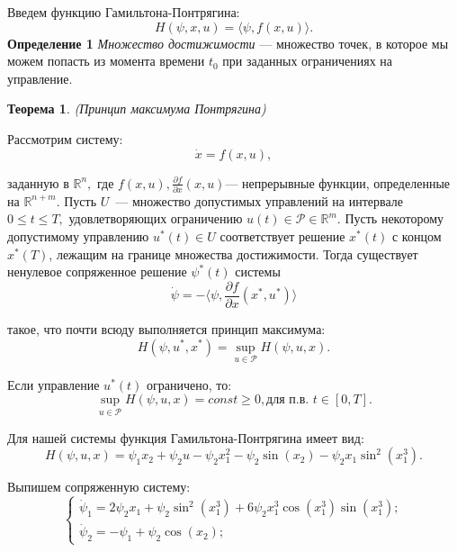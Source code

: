 \documentclass{article}
\theoremstyle{definition}
\begin{document}
	{Введем функцию Гамильтона-Понтрягина: }
	\begin{equation}
	H(\psi, x, u) = \langle \psi, f(x,u) \rangle.
	\end{equation}
	{\textbf{Определение 1} \textit{Множество достижимости} --- множество точек, в которое мы можем попасть из момента времени $t_0$ при заданных ограничениях на управление.}

 	\newtheorem{theorem}{Теорема}
 	\begin{theorem}
 		\textit{(Принцип максимума Понтрягина)}

		Рассмотрим систему:
 		\begin{equation}
 		\dot x = f(x,u),
 		\end{equation}
 		
 		{заданную в $\mathbb{R}^n,$ где $f(x,u), \frac{\partial f}{\partial x}(x,u)$--- непрерывные функции, определенные на $\mathbb{R}^{n + m}.$ Пусть $U$~--- множество допустимых управлений на интервале $0 \leq t \leq T,$ удовлетворяющих ограничению $u(t) \in \mathcal{P} \in \mathbb{R}^m$. Пусть некоторому допустимому управлению $u^*(t) \in U$ соответствует решение $x^*(t)$ с концом $x^*(T)$, лежащим на границе множества достижимости. Тогда существует ненулевое сопряженное решение $\psi^*(t)$ системы}
 		\begin{equation}
 		 \dot \psi = - \langle \psi, \frac{\partial f}{\partial x}(x^*,u^*) \rangle
 		\end{equation}
 		
 		{такое, что почти всюду выполняется принцип максимума:}
 		\begin{equation}
 			H(\psi, u^*, x^*) = \sup \limits_{u \in \mathcal{P}} H(\psi, u, x).
 		\end{equation}
 		
 		{Если управление $u^*(t)$ ограничено, то:}
 		\begin{equation}
 			\sup \limits_{u \in \mathcal{P}}H(\psi, u, x) = const \geq 0, \text{для п.в. } t \in [0, T].
 		\end{equation}
	\end{theorem}
 		
	{Для нашей системы функция Гамильтона-Понтрягина имеет вид:}
	\begin{equation}
		H(\psi, u , x) = \psi_1x_2 + \psi_2u - \psi_2x_1^2 - \psi_2\sin(x_2) - \psi_2x_1\sin^2(x_1^3).
	\end{equation}
	
	{Выпишем сопряженную систему:}
	\begin{equation}
		\begin{cases}
	\dot \psi_1 = 2\psi_2x_1 + \psi_2\sin^2(x_1^3) + 6\psi_2x_1^3\cos(x_1^3)\sin(x_1^3);\\
	\dot \psi_2 = -\psi_1 + \psi_2\cos(x_2);
	\end{cases}
	\end{equation}
 	
\end{document}

